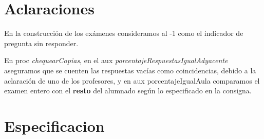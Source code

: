 \documentclass[11pt,a4paper]{article}
\begin{document}
\maketitle

\section{Aclaraciones}

En la construcción de los exámenes consideramos al -1 como el indicador de pregunta sin responder.

En proc \textit{chequearCopias}, en el aux \textit{porcentajeRespuestasIgualAdyacente} aseguramos que se cuenten las respuestas vacías como coincidencias, debido a la aclaración de uno de los profesores, y en aux porcentajeIgualAula comparamos el examen entero con el \textbf{resto} del alumnado según lo especificado en la consigna.

\section{Especificacion}
\end{document}

